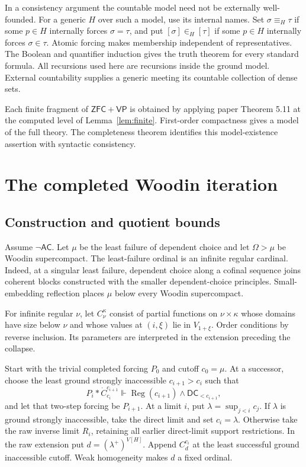 \documentclass[11pt,a4paper]{amsart}
\newcommand{\ZFC}{\ensuremath{\mathsf{ZFC}}}
\newcommand{\AC}{\ensuremath{\mathsf{AC}}}
\newcommand{\VP}{\ensuremath{\mathsf{VP}}}
\newcommand{\DC}{\ensuremath{\mathsf{DC}}}
\begin{document}
In a consistency argument the countable model need not be externally well-founded. For a generic $H$ over such a model, use its internal names. Set $\sigma\equiv_H\tau$ if some $p\in H$ internally forces $\sigma=\tau$, and put $[\sigma]\in_H[\tau]$ if some $p\in H$ internally forces $\sigma\in\tau$. Atomic forcing makes membership independent of representatives. The Boolean and quantifier induction gives the truth theorem for every standard formula. All recursions used here are recursions inside the ground model. External countability supplies a generic meeting its countable collection of dense sets.

Each finite fragment of $\ZFC+\VP$ is obtained by applying paper Theorem 5.11 at the computed level of Lemma~\ref{lem:finite}. First-order compactness gives a model of the full theory. The completeness theorem identifies this model-existence assertion with syntactic consistency.

\section{The completed Woodin iteration}\label{sec:woodin}
\subsection{Construction and quotient bounds}
Assume $\neg\AC$. Let $\mu$ be the least failure of dependent choice and let $\Omega>\mu$ be Woodin supercompact. The least-failure ordinal is an infinite regular cardinal. Indeed, at a singular least failure, dependent choice along a cofinal sequence joins coherent blocks constructed with the smaller dependent-choice principles. Small-embedding reflection places $\mu$ below every Woodin supercompact.

For infinite regular $\nu$, let $C_\nu^\kappa$ consist of partial functions on $\nu\times\kappa$ whose domains have size below $\nu$ and whose values at $(i,\xi)$ lie in $V_{1+\xi}$. Order conditions by reverse inclusion. Its parameters are interpreted in the extension preceding the collapse.

Start with the trivial completed forcing $P_0$ and cutoff $c_0=\mu$. At a successor, choose the least ground strongly inaccessible $c_{i+1}>c_i$ such that
\[
P_i*\dot C_{c_i}^{c_{i+1}}\Vdash
\operatorname{Reg}(c_{i+1})\land\DC_{<c_{i+1}},
\]
and let that two-step forcing be $P_{i+1}$. At a limit $i$, put $\lambda=\sup_{j<i}c_j$. If $\lambda$ is ground strongly inaccessible, take the direct limit and set $c_i=\lambda$. Otherwise take the raw inverse limit $R_i$, retaining all earlier direct-limit support restrictions. In the raw extension put $d=(\lambda^+)^{V[H]}$. Append $C_d^{c_i}$ at the least successful ground inaccessible cutoff. Weak homogeneity makes $d$ a fixed ordinal.
\end{document}

